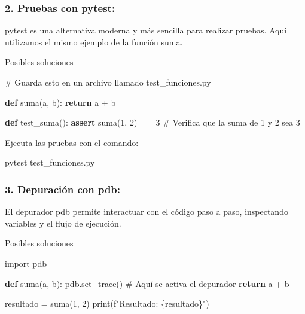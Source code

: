 \documentclass[
  a4paper,
  DIV=11,
  numbers=noendperiod,
  onepage,
  openany]{scrreprt}
\newenvironment{Shaded}{\begin{snugshade}}{\end{snugshade}}
\newcommand{\BuiltInTok}[1]{\textcolor[rgb]{0.00,0.23,0.31}{#1}}
\newcommand{\CommentTok}[1]{\textcolor[rgb]{0.37,0.37,0.37}{#1}}
\newcommand{\ControlFlowTok}[1]{\textcolor[rgb]{0.00,0.23,0.31}{\textbf{#1}}}
\newcommand{\DecValTok}[1]{\textcolor[rgb]{0.68,0.00,0.00}{#1}}
\newcommand{\ExtensionTok}[1]{\textcolor[rgb]{0.00,0.23,0.31}{#1}}
\newcommand{\ImportTok}[1]{\textcolor[rgb]{0.00,0.46,0.62}{#1}}
\newcommand{\KeywordTok}[1]{\textcolor[rgb]{0.00,0.23,0.31}{\textbf{#1}}}
\newcommand{\NormalTok}[1]{\textcolor[rgb]{0.00,0.23,0.31}{#1}}
\newcommand{\OperatorTok}[1]{\textcolor[rgb]{0.37,0.37,0.37}{#1}}
\newcommand{\SpecialCharTok}[1]{\textcolor[rgb]{0.37,0.37,0.37}{#1}}
\newcommand{\SpecialStringTok}[1]{\textcolor[rgb]{0.13,0.47,0.30}{#1}}
\begin{document}
\subsubsection{2. Pruebas con pytest:}\label{pruebas-con-pytest}

pytest es una alternativa moderna y más sencilla para realizar pruebas.
Aquí utilizamos el mismo ejemplo de la función suma.

Posibles soluciones

\begin{Shaded}
\begin{Highlighting}[]
\CommentTok{\# Guarda esto en un archivo llamado test\_funciones.py}

\KeywordTok{def}\NormalTok{ suma(a, b):}
    \ControlFlowTok{return}\NormalTok{ a }\OperatorTok{+}\NormalTok{ b}

\KeywordTok{def}\NormalTok{ test\_suma():}
    \ControlFlowTok{assert}\NormalTok{ suma(}\DecValTok{1}\NormalTok{, }\DecValTok{2}\NormalTok{) }\OperatorTok{==} \DecValTok{3}  \CommentTok{\# Verifica que la suma de 1 y 2 sea 3}
\end{Highlighting}
\end{Shaded}

Ejecuta las pruebas con el comando:

\begin{Shaded}
\begin{Highlighting}[]
\ExtensionTok{pytest}\NormalTok{ test\_funciones.py}
\end{Highlighting}
\end{Shaded}

\subsubsection{3. Depuración con pdb:}\label{depuraciuxf3n-con-pdb}

El depurador pdb permite interactuar con el código paso a paso,
inspectando variables y el flujo de ejecución.

Posibles soluciones

\begin{Shaded}
\begin{Highlighting}[]
\ImportTok{import}\NormalTok{ pdb}

\KeywordTok{def}\NormalTok{ suma(a, b):}
\NormalTok{    pdb.set\_trace()  }\CommentTok{\# Aquí se activa el depurador}
    \ControlFlowTok{return}\NormalTok{ a }\OperatorTok{+}\NormalTok{ b}

\NormalTok{resultado }\OperatorTok{=}\NormalTok{ suma(}\DecValTok{1}\NormalTok{, }\DecValTok{2}\NormalTok{)}
\BuiltInTok{print}\NormalTok{(}\SpecialStringTok{f"Resultado: }\SpecialCharTok{\{}\NormalTok{resultado}\SpecialCharTok{\}}\SpecialStringTok{"}\NormalTok{)}
\end{Highlighting}
\end{Shaded}
\end{document}

